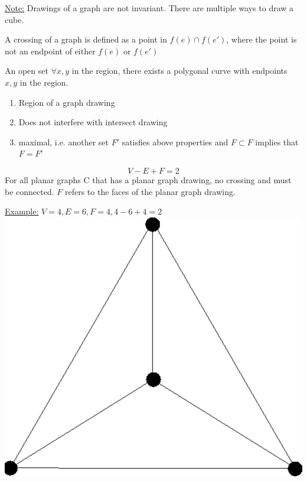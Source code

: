\documentclass[12pt]{article}
\begin{document}
\begin{tcolorbox}
	\underline{Note:} Drawings of a graph are not invariant. There are multiple ways to draw a cube.
\end{tcolorbox}

\begin{tcolorbox}[title=Definition: Crossing of a graph]
	A crossing of a graph is defined as a point in $f(e) \cap f(e')$, where the point is not an endpoint of either $f(e)$ or $f(e')$
\end{tcolorbox}

\begin{tcolorbox}[title=Definition: Region in $\mathbb{R}^n$]
	An open set $\forall x,y$ in the region, there exists a polygonal curve with endpoints $x,y$ in the region.
\end{tcolorbox}

\begin{tcolorbox}[title=Definition: Face]
	\begin{enumerate}
		\item{Region of a graph drawing}
		\item{Does not interfere with intersect drawing}
		\item{maximal, i.e. another set $F'$ satisfies above properties and $F \subset F$ implies that $F = F'$}
	\end{enumerate}
\end{tcolorbox}

\begin{tcolorbox}[title=Euler's Formula]
	$$V-E+F=2$$
	For all planar graphs C that has a planar graph drawing, no crossing and must be connected. $F$ refers to the faces of the planar graph drawing.
\end{tcolorbox}

\underline{Example:} $V=4, E=6, F=4, 4-6+4=2$\\
\includegraphics[scale=0.25]{lec12-1}
\end{document}
